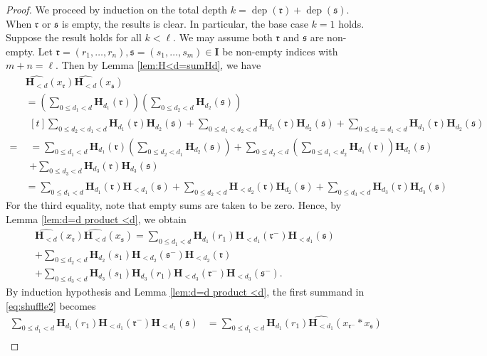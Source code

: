 \documentclass[10pt,a4paper]{amsart}
\newcommand{\Ical}{\mathbf{I}}
\newcommand{\dep}{\operatorname{dep}}
\newcommand{\ww}[1]{\mathfrak{#1}}
\renewcommand{\H}{\mathbf{H}}
\begin{document}
\begin{proof}
     We proceed by induction on the total depth $k=\dep(\ww{r})+\dep(\ww{s})$. When $\ww{r}$ or $\ww{s}$ is empty, the results is clear. In particular, the base case $k=1$ holds. Suppose the result holds for all $k<\ell$. We may assume both $\ww{r}$ and $\ww{s}$ are non-empty.  Let 
    $\ww{r}=(r_1,\ldots,r_n),\ww{s}=(s_1,\ldots,s_m)\in\Ical$ be non-empty indices
    with $m+n=\ell$.
    Then by Lemma \ref{lem:H<d=sumHd}, we have
    \begin{align*}
        &\widehat{\H_{<d}}(x_{\ww{r}})\widehat{\H_{<d}}(x_{\ww{s}})\\
        &=\left(\sum_{0\leq d_1<d}\H_{d_1}(\ww{r})\right)\left(\sum_{0\leq d_2<d}\H_{d_2}(\ww{s})\right)
        \\
        ={} &\begin{multlined}[t]
        \sum_{0\leq d_2<d_1<d}\H_{d_1}(\ww{r})\H_{d_2}(\ww{s})+\sum_{0\leq d_1<d_2<d}\H_{d_1}(\ww{r})\H_{d_2}(\ww{s})+\sum_{0\leq d_2=d_1<d}\H_{d_1}(\ww{r})\H_{d_2}(\ww{s})\\
        =\sum_{0\leq d_1<d}\H_{d_1}(\ww{r})\left(\sum_{0\leq d_2<d_1}\H_{d_2}(\ww{s})\right)+\sum_{0\leq d_2<d}\left(\sum_{0\leq d_1<d_2}\H_{d_1}(\ww{r})\right)\H_{d_2}(\ww{s})  
            \\+ \sum_{0\leq d_3<d}\H_{d_3}(\ww{r})\H_{d_3}(\ww{s})
        \end{multlined}\\
        &=\sum_{0\leq d_1<d}\H_{d_1}(\ww{r})\H_{<d_1}(\ww{s})+\sum_{0\leq d_2<d}\H_{<d_2}(\ww{r})\H_{d_2}(\ww{s})  
            + \sum_{0\leq d_3<d}\H_{d_3}(\ww{r})\H_{d_3}(\ww{s})
    \end{align*}
    For the third equality, note that empty sums are taken to be zero.
    Hence, by Lemma \ref{lem:d=d product <d}, we obtain
    \begin{multline}\label{eq:shuffle2}
\widehat{\H_{<d}}(x_{\ww{r}})\widehat{\H_{<d}}(x_{\ww{s}})
= \sum_{0\leq d_1<d} \H_{d_1}(r_1) \H_{<d_1}(\ww{r}^-) \H_{<d_1}(\ww{s}) \\
+ \sum_{0\leq d_2<d} \H_{d_2}(s_1) \H_{<d_2}(\ww{s}^-) \H_{<d_2}(\ww{r}) \\
+ \sum_{0\leq d_3<d} \H_{d_3}(s_1) \H_{d_3}(r_1) \H_{<d_3}(\ww{r}^-) \H_{<d_3}(\ww{s}^-).
\end{multline}
By induction hypothesis and Lemma \ref{lem:d=d product <d}, the first summand in \eqref{eq:shuffle2} becomes
    \begin{align*}
        \sum_{0\leq d_1<d}\H_{d_1}({r_1})\H_{<d_1}({\ww{r}^-})\H_{<d_1}(\ww{s})&=\sum_{0\leq d_1<d}\H_{d_1}(r_1)\widehat{\H_{<d_1}}(x_{\ww{r}^-}\ast x_{\ww{s}})\\

\end{align*}
\end{proof}
\end{document}
